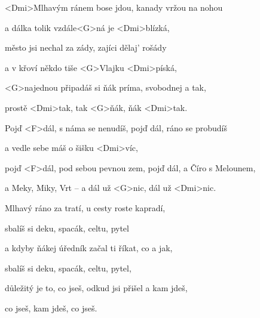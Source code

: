 

\zs
<Dmi>Mlhavým ránem bose jdou, kanady vržou na nohou

a dálka tolik vzdále<G>ná je <Dmi>blízká,

město jsi nechal za zády, zajíci dělaj' rošády

a v křoví někdo tiše <G>Vlajku <Dmi>píská,

<G>najednou připadáš si ňák príma, svobodnej a tak,

prostě <Dmi>tak, tak <G>ňák, ňák <Dmi>tak.
\ks

\zr
Pojď <F>dál, s náma se nenudíš, pojď dál, ráno se probudíš

a vedle sebe máš o šišku <Dmi>víc,

pojď <F>dál, pod sebou pevnou zem, pojď dál, a Číro s Melounem,

a Meky, Miky, Vrt -- a dál už <G>nic, dál už <Dmi>nic.
\kr

\zs
Mlhavý ráno za tratí, u cesty roste kapradí,

sbalíš si deku, spacák, celtu, pytel

a kdyby ňákej úředník začal ti říkat, co a jak,

sbalíš si deku, spacák, celtu, pytel,

důležitý je to, co jseš, odkud jsi přišel a kam jdeš,

co jseš, kam jdeš, co jseš.
\ks

\zr \kr

\kp

